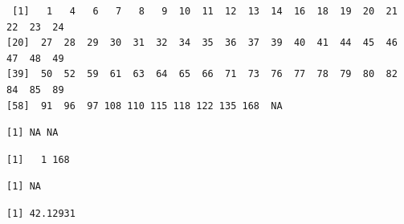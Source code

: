 \documentclass[
  letterpaper,
  DIV=11,
  numbers=noendperiod]{scrreprt}
\newenvironment{Shaded}{\begin{snugshade}}{\end{snugshade}}
\newcommand{\AttributeTok}[1]{\textcolor[rgb]{0.40,0.45,0.13}{#1}}
\newcommand{\ConstantTok}[1]{\textcolor[rgb]{0.56,0.35,0.01}{#1}}
\newcommand{\FunctionTok}[1]{\textcolor[rgb]{0.28,0.35,0.67}{#1}}
\newcommand{\NormalTok}[1]{\textcolor[rgb]{0.00,0.23,0.31}{#1}}
\newcommand{\SpecialCharTok}[1]{\textcolor[rgb]{0.37,0.37,0.37}{#1}}
\begin{document}
\begin{verbatim}
 [1]   1   4   6   7   8   9  10  11  12  13  14  16  18  19  20  21  22  23  24
[20]  27  28  29  30  31  32  34  35  36  37  39  40  41  44  45  46  47  48  49
[39]  50  52  59  61  63  64  65  66  71  73  76  77  78  79  80  82  84  85  89
[58]  91  96  97 108 110 115 118 122 135 168  NA
\end{verbatim}

\begin{Shaded}
\end{Shaded}

\begin{verbatim}
[1] NA NA
\end{verbatim}

\begin{Shaded}
\end{Shaded}

\begin{verbatim}
[1]   1 168
\end{verbatim}

\begin{Shaded}
\end{Shaded}

\begin{verbatim}
[1] NA
\end{verbatim}

\begin{Shaded}
\end{Shaded}

\begin{verbatim}
[1] 42.12931
\end{verbatim}
\end{document}
